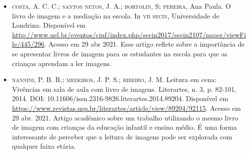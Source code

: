 \documentclass[11pt]{extarticle}
\begin{document}
\begin{itemize}
\item \textsc{costa}, A. C. C.; \textsc{santos netos}, J. A.; \textsc{bortolin}, S; \textsc{pereira}, Ana Paula. O livro de imagem e a mediação na escola. 
In \textsc{vii secin}, Universidade de Londrina. Disponível em \url{http://www.uel.br/eventos/cinf/index.php/secin2017/secin2107/paper/viewFile/445/296}. 
Acesso em 29 abr 2021. 
Esse artigo reflete sobre a importância de se apresentar livros de imagem para os estudantes na escola para que as crianças aprendam a ler imagens. 

\item \textsc{nannini}, P. B. R.; \textsc{medeiros}, J. P. S.; \textsc{ribeiro}, J. M. Leitura em cena: Vivências em sala de aula com livro de imagens. 
Literartes, n. 3, p. 82-101, 2014. DOI: 10.11606/issn.2316-9826.literartes.2014.89204. 
Disponível em \url{https://www.revistas.usp.br/literartes/article/view/89204/92115}. Acesso em 29 abr. 2021. 
Artigo acadêmico sobre um trabalho utilizando o mesmo livro de imagem com crianças da educação infantil e ensino médio. 
É uma forma interessante de perceber que a leitura de imagens pode ser explorada com qualquer faixa etária. 
\end{itemize}

% 
\end{document}
